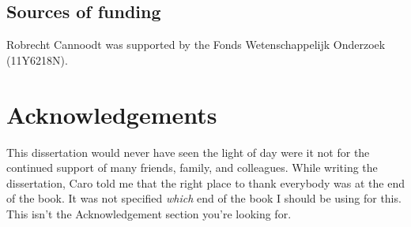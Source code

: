 \section{Sources of funding}
Robrecht Cannoodt was supported by the Fonds Wetenschappelijk Onderzoek (11Y6218N).


\newpage{\thispagestyle{empty}\cleardoublepage}
\chapter*{Acknowledgements}

This dissertation would never have seen the light of day were it not for the continued support of many friends, family, and colleagues. While writing the dissertation, Caro told me that the right place to thank everybody was at the end of the book. It was not specified \textit{which} end of the book I should be using for this. This isn't the Acknowledgement section you're looking for. 


